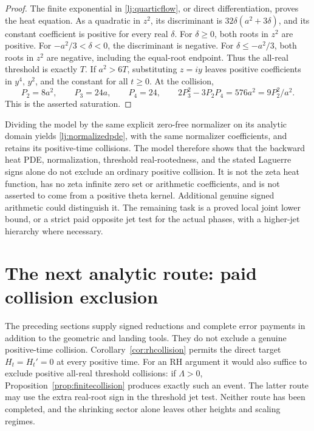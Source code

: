 \documentclass[11pt]{article}
\numberwithin{equation}{section}
\theoremstyle{definition}
\theoremstyle{remark}
\begin{document}
\begin{proof}
The finite exponential in \eqref{lj:quarticflow}, or direct
differentiation, proves the heat equation. As a quadratic in \(z^2\),
its discriminant is \(32\delta(a^2+3\delta)\), and its constant
coefficient is positive for every real \(\delta\).
For \(\delta\ge0\), both roots in \(z^2\) are positive.
For \(-a^2/3<\delta<0\), the discriminant is negative.
For \(\delta\le-a^2/3\), both roots in \(z^2\) are negative,
including the equal-root endpoint. Thus the all-real threshold is
exactly \(T\).
If \(a^2>6T\), substituting \(z=iy\) leaves positive coefficients
in \(y^4\), \(y^2\), and the constant for all \(t\ge0\).
At the collision,
\[
 P_2=8a^2,\qquad P_3=24a,\qquad P_4=24,\qquad
 2P_3^2-3P_2P_4=576a^2=9P_2^2/a^2.
\]
This is the asserted saturation.
\end{proof}

Dividing the model by the same explicit zero-free normalizer on its
analytic domain yields \eqref{lj:normalizedpde}, with the same
normalizer coefficients, and retains its positive-time collisions.
The model therefore shows that the backward heat PDE, normalization,
threshold real-rootedness, and the stated Laguerre signs alone do not
exclude an ordinary positive collision. It is not the zeta heat
function, has no zeta infinite zero set or arithmetic coefficients,
and is not asserted to come from a positive theta kernel.
Additional genuine signed arithmetic could distinguish it.
The remaining task is a proved local joint lower bound, or a strict
paid opposite jet test for the actual phases, with a higher-jet
hierarchy where necessary.


\section{The next analytic route: paid collision exclusion}
\label{sec:outlook}
The preceding sections supply signed reductions and complete error
payments in addition to the geometric and landing tools. They do not
exclude a genuine positive-time collision. Corollary~\ref{cor:rhcollision}
permits the direct target $H_t=H_t'=0$ at every positive time. For an
RH argument it would also suffice to exclude positive all-real threshold
collisions: if $\Lambda>0$, Proposition~\ref{prop:finitecollision}
produces exactly such an event. The latter route may use the extra
real-root sign in the threshold jet test. Neither route has been completed,
and the shrinking sector alone leaves other heights and scaling regimes.
\end{document}

